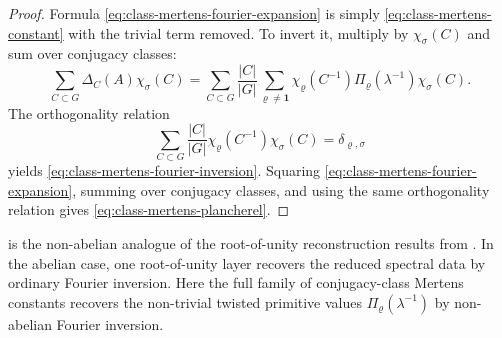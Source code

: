 \begin{proof}
  Formula \eqref{eq:class-mertens-fourier-expansion} is simply
  \eqref{eq:class-mertens-constant} with the trivial term removed. To
  invert it, multiply by \(\chi_\sigma(C)\) and sum over conjugacy
  classes:
  \[
    \sum_{C\subset G}\Delta_C(A)\chi_\sigma(C)
    =
    \sum_{C\subset G}\frac{|C|}{|G|}
      \sum_{\varrho\neq\mathbf 1}
        \chi_\varrho(C^{-1})\Pi_\varrho(\lambda^{-1})\chi_\sigma(C).
  \]
  The orthogonality relation
  \[
    \sum_{C\subset G}\frac{|C|}{|G|}
      \chi_\varrho(C^{-1})\chi_\sigma(C)
    =\delta_{\varrho,\sigma}
  \]
  yields \eqref{eq:class-mertens-fourier-inversion}. Squaring
  \eqref{eq:class-mertens-fourier-expansion}, summing over conjugacy
  classes, and using the same orthogonality relation gives
  \eqref{eq:class-mertens-plancherel}.
\end{proof}

\begin{remark}
   is the non-abelian analogue of the
  root-of-unity reconstruction results from . In
  the abelian case, one root-of-unity layer recovers the reduced
  spectral data by ordinary Fourier inversion. Here the full family of
  conjugacy-class Mertens constants recovers the non-trivial twisted
  primitive values \(\Pi_\varrho(\lambda^{-1})\) by non-abelian Fourier
  inversion.
\end{remark}

